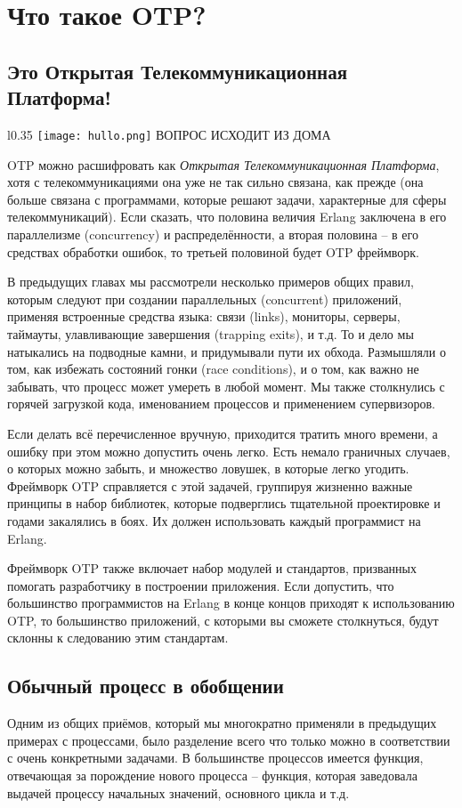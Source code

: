 \chapter{Что такое OTP?}
\label{what-is-otp}
\section{Это Открытая Телекоммуникационная Платформа!}
\label{its-the-open-telecom-platform}
\begin{wrapfigure}{l}{0.35\linewidth}
    \texttt{[image: hullo.png]}
    ВОПРОС ИСХОДИТ ИЗ ДОМА
\end{wrapfigure}
OTP можно расшифровать как \emph{Открытая Телекоммуникационная Платформа}, хотя с телекоммуникациями она уже не так сильно связана, как прежде (она больше связана с программами, которые решают задачи, характерные для сферы телекоммуникаций).
Если сказать, что половина величия Erlang заключена в его параллелизме (concurrency) и распределённости, а вторая половина \--- в его средствах обработки ошибок, то третьей половиной будет OTP фреймворк.

В предыдущих главах мы рассмотрели несколько примеров общих правил, которым следуют при создании параллельных (concurrent) приложений, применяя встроенные средства языка: связи (links), мониторы, серверы, таймауты, улавливающие завершения (trapping exits), и т.д.
То и дело мы натыкались на подводные камни, и придумывали пути их обхода.
Размышляли о том, как избежать состояний гонки (race conditions), и о том, как важно не забывать, что процесс может умереть в любой момент.
Мы также столкнулись с горячей загрузкой кода, именованием процессов и применением супервизоров.

Если делать всё перечисленное вручную, приходится тратить много времени, а ошибку при этом можно допустить очень легко.
Есть немало граничных случаев, о которых можно забыть, и множество ловушек, в которые легко угодить.
Фреймворк OTP справляется с этой задачей, группируя жизненно важные принципы в набор библиотек, которые подверглись тщательной проектировке и годами закалялись в боях.
Их должен использовать каждый программист на Erlang.

Фреймворк OTP также включает набор модулей и стандартов, призванных помогать разработчику в построении приложения.
Если допустить, что большинство программистов на Erlang в конце концов приходят к использованию OTP, то большинство приложений, с которыми вы сможете столкнуться, будут склонны к следованию этим стандартам. 
\section{Обычный процесс в обобщении}
\label{the-common-process-abstracted}
Одним из общих приёмов, который мы многократно применяли в предыдущих примерах с процессами, было разделение всего что только можно в соответствии с очень конкретными задачами.
В большинстве процессов имеется функция, отвечающая за порождение нового процесса \--- функция, которая заведовала выдачей процессу начальных значений, основного цикла и т.д.

